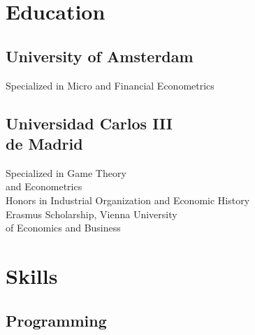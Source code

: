 \documentclass[]{deedy-resume-openfont}
\begin{document}
%
%
\lastupdated

%
%





%
%

\begin{minipage}[t]{0.33\textwidth} 


\section{Education} 

\subsection{University of Amsterdam}
Specialized in Micro and Financial Econometrics
\sectionsep

\subsection{Universidad Carlos III \\ de Madrid}
Specialized in Game Theory \\ and Econometrics \\
Honors in Industrial Organization and Economic History \\
Erasmus Scholarship, Vienna University \\ of Economics and Business \\
\sectionsep


\section{Skills}
\subsection{Programming}


\end{minipage}
\end{document}
